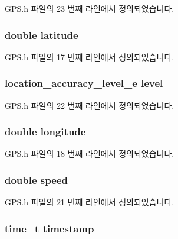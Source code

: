G\-P\-S.\-h 파일의 23 번째 라인에서 정의되었습니다.

\hypertarget{struct__location_a76714bdbc5c536fa77dfb14533ff82a9}{
\subsubsection[{latitude}]{\setlength{\rightskip}{0pt plus 5cm}double latitude}}\label{struct__location_a76714bdbc5c536fa77dfb14533ff82a9}


G\-P\-S.\-h 파일의 17 번째 라인에서 정의되었습니다.

\hypertarget{struct__location_ab42edaa8e596f16b6ff545b9256a4508}{
\subsubsection[{level}]{\setlength{\rightskip}{0pt plus 5cm}location\-\_\-accuracy\-\_\-level\-\_\-e level}}\label{struct__location_ab42edaa8e596f16b6ff545b9256a4508}


G\-P\-S.\-h 파일의 22 번째 라인에서 정의되었습니다.

\hypertarget{struct__location_ac155e35fdeebafc89723a51520fb9fe6}{
\subsubsection[{longitude}]{\setlength{\rightskip}{0pt plus 5cm}double longitude}}\label{struct__location_ac155e35fdeebafc89723a51520fb9fe6}


G\-P\-S.\-h 파일의 18 번째 라인에서 정의되었습니다.

\hypertarget{struct__location_a6dc6e6f3c75c509ce943163afb5dade7}{
\subsubsection[{speed}]{\setlength{\rightskip}{0pt plus 5cm}double speed}}\label{struct__location_a6dc6e6f3c75c509ce943163afb5dade7}


G\-P\-S.\-h 파일의 21 번째 라인에서 정의되었습니다.

\hypertarget{struct__location_a2f48d949c7a1e7bf2ce81c70caa7c3ec}{
\subsubsection[{timestamp}]{\setlength{\rightskip}{0pt plus 5cm}time\-\_\-t timestamp}}\label{struct__location_a2f48d949c7a1e7bf2ce81c70caa7c3ec}


